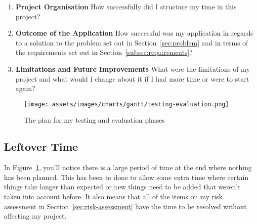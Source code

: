 \begin{enumerate}
  \item \textbf{Project Organisation} How successfully did I structure my time in this project?
  \item \textbf{Outcome of the Application} How successful was my application in regards to a solution to the problem set out in Section~\ref{sec:problem} and in terms of the requirements set out in Section~\ref{subsec:requirements}?
  \item \textbf{Limitations and Future Improvements} What were the limitations of my project and what would I change about it if I had more time or were to start again?
\end{enumerate}

\begin{figure}[ht]
  \centering
  \texttt{[image: assets/images/charts/gantt/testing-evaluation.png]}
  \caption{The plan for my testing and evaluation phases}
  \label{fig:final-gantt}
\end{figure}

\subsection*{Leftover Time}

In Figure~\ref{fig:final-gantt}, you'll notice there is a large period of time at the end where nothing has been planned. This has been to done to allow some extra time where certain things take longer than expected or new things need to be added that weren't taken into account before. It also means that all of the items on my risk assessment in Section~\ref{sec:risk-assessment} have the time to be resolved without affecting my project.
